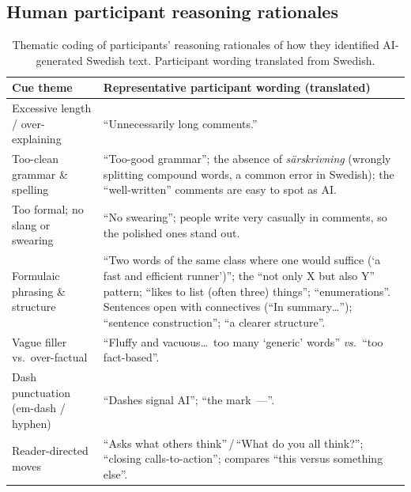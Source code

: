 \documentclass[thesis]{cluu}
\begin{document}
\subsection{Human participant reasoning rationales}
\begin{table}[H]
  \centering
  \footnotesize
  \setlength{\tabcolsep}{5pt}
  \renewcommand{\arraystretch}{1.2}
  \begin{tabularx}{\linewidth}{@{}>{\raggedright\arraybackslash}p{3.2cm} X@{}}
    \toprule
    \textbf{Cue theme} & \textbf{Representative participant wording (translated)} \\
    \midrule
    Excessive length / over-explaining
      & ``Unnecessarily long comments.'' \\
    \addlinespace[2pt]
    Too-clean grammar \& spelling
      & ``Too-good grammar''; the absence of \emph{särskrivning} (wrongly splitting compound words, a common error in Swedish); the ``well-written'' comments are easy to spot as AI. \\
    \addlinespace[2pt]
    Too formal; no slang or swearing
      & ``No swearing''; people write very casually in comments, so the polished ones stand out. \\
    \addlinespace[2pt]
    Formulaic phrasing \& structure
      & ``Two words of the same class where one would suffice (`a fast and efficient runner')''; the ``not only X but also Y'' pattern; ``likes to list (often three) things''; ``enumerations''. Sentences open with connectives (``In summary\ldots''); ``sentence construction''; ``a clearer structure''. \\
    \addlinespace[2pt]
    Vague filler vs.\ over-factual
      & ``Fluffy and vacuous\ldots\ too many `generic' words'' \emph{vs.}\ ``too fact-based''. \\
    \addlinespace[2pt]
    Dash punctuation (em-dash / hyphen)
      & ``Dashes signal AI''; ``the mark~---''. \\
    \addlinespace[2pt]
    Reader-directed moves
      & ``Asks what others think''\,/\,``What do you all think?''; ``closing calls-to-action''; compares ``this versus something else''. \\
    \bottomrule
  \end{tabularx}
  \caption{\footnotesize Thematic coding of participants' reasoning rationales of how they
  identified AI-generated Swedish text. Participant wording translated from Swedish.}
  \label{tab:human-rationale-cues}
\end{table}
\end{document}
